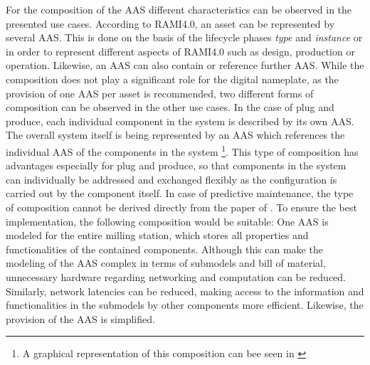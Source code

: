 For the composition of the \ac{AAS} different characteristics can be observed in the presented use cases. According to \ac{RAMI4.0}, an asset can be represented by several \ac{AAS}. This is done on the basis of the lifecycle phases \textit{type} and \textit{instance} or in order to represent different aspects of \ac{RAMI4.0} such as design, production or operation. Likewise, an \ac{AAS} can also contain or reference further \ac{AAS}. While the composition does not play a significant role for the digital nameplate, as the provision of one \ac{AAS} per asset is recommended, two different forms of composition can be observed in the other use cases. In the case of plug and produce, each individual component in the system is described by its own \ac{AAS}. The overall system itself is being represented by an \ac{AAS} which references the individual \ac{AAS} of the components in the system \footnote{A graphical representation of this composition can bee seen in \citet[p. 246, figure 3]{Schweizer2021ProcessSystems}}. This type of composition has advantages especially for plug and produce, so that components in the system can individually be addressed and exchanged flexibly as the configuration is carried out by the component itself. In case of predictive maintenance, the type of composition cannot be derived directly from the paper of \citeauthor{Cavalieri2020AShell}. To ensure the best implementation, the following composition would be suitable: One \ac{AAS} is modeled for the entire milling station, which stores all properties and functionalities of the contained components. Although this can make the modeling of the \ac{AAS} complex in terms of submodels and bill of material, unnecessary hardware regarding networking and computation can be reduced. Similarly, network latencies can be reduced, making access to the information and functionalities in the submodels by other components more efficient. Likewise, the provision of the \ac{AAS} is simplified.




